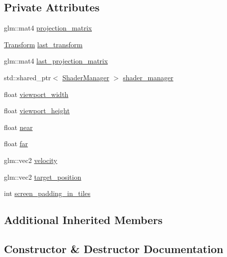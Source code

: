 \subsection*{Private Attributes}
\begin{DoxyCompactItemize}
\item 
glm\+::mat4 \hyperlink{class_graphics_1_1_camera_a7b168f8afa0098c51f64853605a08fc8}{projection\+\_\+matrix}
\item 
\hyperlink{class_transform}{Transform} \hyperlink{class_graphics_1_1_camera_af70f9f26e21cef48e41bb0b025b8528d}{last\+\_\+transform}
\item 
glm\+::mat4 \hyperlink{class_graphics_1_1_camera_a61b7cb1de65dc8a4f444598a71c3b853}{last\+\_\+projection\+\_\+matrix}
\item 
std\+::shared\+\_\+ptr$<$ \hyperlink{class_graphics_1_1_shader_manager}{Shader\+Manager} $>$ \hyperlink{class_graphics_1_1_camera_a60d25d91283365ea01a54a81e0f9246b}{shader\+\_\+manager}
\item 
float \hyperlink{class_graphics_1_1_camera_ae08e862d5cf284a8d28a5b5bebdf1d33}{viewport\+\_\+width}
\item 
float \hyperlink{class_graphics_1_1_camera_acc8b30298da1779394bbafb91f5a7855}{viewport\+\_\+height}
\item 
float \hyperlink{class_graphics_1_1_camera_ad4c61e1382447826985b5a5445379375}{near}
\item 
float \hyperlink{class_graphics_1_1_camera_a1d6d4c2d74d4d25ef66900bf603e88af}{far}
\item 
glm\+::vec2 \hyperlink{class_graphics_1_1_camera_aefe34c1354a1e2f45db923da5686e1d5}{velocity}
\item 
glm\+::vec2 \hyperlink{class_graphics_1_1_camera_a95457d183395bfd80e63ede6418f35f7}{target\+\_\+position}
\item 
int \hyperlink{class_graphics_1_1_camera_adce9d36698524aaeae74211059efc556}{screen\+\_\+padding\+\_\+in\+\_\+tiles}
\end{DoxyCompactItemize}
\subsection*{Additional Inherited Members}


\subsection{Constructor \& Destructor Documentation}
\hypertarget{class_graphics_1_1_camera_a357a2294fe254fc1dd24061336f7fef9}{}
